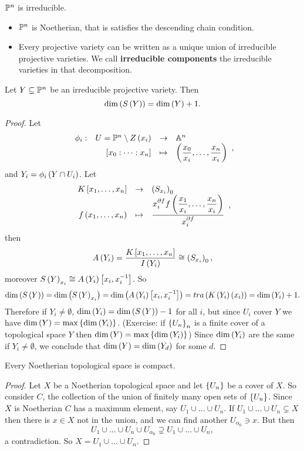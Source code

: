 \begin{example}
$ \P^n $ is irreducible.
\end{example}

\begin{proposition}
\hfill
\begin{itemize}
\item $ \P^n $ is Noetherian, that is satisfies the descending chain condition.
\item Every projective variety can be written as a unique union of irreducible projective varieties. We call \textbf{irreducible components} the irreducible varieties in that decomposition.
\end{itemize}
\end{proposition}

\begin{theorem}
Let $ Y \subseteq \P^n $ be an irreducible projective variety. Then
$$ \dim\rb{S\rb{Y}} = \dim\rb{Y} + 1. $$
\end{theorem}

\begin{proof}
Let
$$ \function[\phi_i]{U = \P^n \setminus Z\rb{x_i}}{\A^n}{\sb{x_0 : \dots : x_n}}{\rb{\dfrac{x_0}{x_i}, \dots, \dfrac{x_n}{x_i}}}, $$
and $ Y_i = \phi_i\rb{Y \cap U_i} $. Let
$$ \function{K\sb{x_1, \dots, x_n}}{\rb{S_{x_i}}_0}{f\rb{x_1, \dots, x_n}}{\dfrac{x_i^{\partial f}f\rb{\dfrac{x_1}{x_i}, \dots, \dfrac{x_n}{x_i}}}{x_i^{\partial f}}}, $$
then
$$ A\rb{Y_i} = \dfrac{K\sb{x_1, \dots, x_n}}{I\rb{Y_i}} \cong \rb{S_{x_i}}_0, $$
moreover $ S\rb{Y}_{x_i} \cong A\rb{Y_i}\sb{x_i, x_i^{-1}} $. So
$$ \dim\rb{S\rb{Y}} = \dim\rb{S\rb{Y}_{x_i}} = \dim\rb{A\rb{Y_i}\sb{x_i, x_i^{-1}}} = tra\rb{K\rb{Y_i}\rb{x_i}} = \dim\rb{Y_i} + 1. $$
Therefore if $ Y_i \ne \emptyset $, $ \dim\rb{Y_i} = \dim\rb{S\rb{Y}} - 1 $ for all $ i $, but since $ U_i $ cover $ Y $ we have $ \dim\rb{Y} = \max\cb{\dim\rb{Y_i}} $. (Exercise: if $ \cb{U_n}_n $ is a finite cover of a topological space $ Y $ then $ \dim\rb{Y} = \max\cb{\dim\rb{Y_i}} $) Since $ \dim\rb{Y_i} $ are the same if $ Y_i \ne \emptyset $, we conclude that $ \dim\rb{Y} = \dim\rb{Y_d} $ for some $ d $.
\end{proof}


\begin{proposition}
Every Noetherian topological space is compact.
\end{proposition}

\begin{proof}
Let $ X $ be a Noetherian topological space and let $ \cb{U_n} $ be a cover of $ X $. So consider $ C $, the collection of the union of finitely many open sets of $ \cb{U_n} $. Since $ X $ is Noetherian $ C $ has a maximum element, say $ U_1 \cup \dots \cup U_n $. If $ U_1 \cup \dots \cup U_n \subsetneq X $ then there is $ x \in X $ not in the union, and we can find another $ U_{\alpha_0} \ni x $. But then
$$ U_1 \cup \dots \cup U_n \cup U_{\alpha_0} \supsetneq U_1 \cup \dots \cup U_n, $$
a contradiction. So $ X = U_1 \cup \dots \cup U_n $.
\end{proof}

